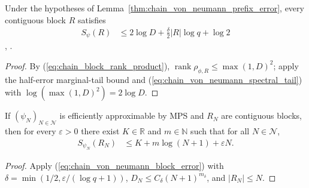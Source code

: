 \begin{lemma}
    \label{thm:chain_von_neumann_block_error}
    \leanok
    Under the hypotheses of Lemma~\ref{thm:chain_von_neumann_prefix_error},
    every contiguous block $R$ satisfies
    \begin{align}
        \label{eq:chain_von_neumann_block_error}
        S_\psi(R) & \le2\log D+\frac{\delta}{2}|R|\log q+\log2
    \end{align}
    \cite[lines 269--305]{Schuch2008EntropyScaling},
    \cite{gap:swvc08_von_neumann_error_range,gap:swvc08_interior_block_bond_rank}.
\end{lemma}
\begin{proof}\leanok
    By (\ref{eq:chain_block_rank_product}),
    $\operatorname{rank}\rho_{\phi,R}\le\max(1,D)^2$; apply the half-error
    marginal-tail bound and (\ref{eq:chain_von_neumann_spectral_tail}) with
    $\log(\max(1,D)^2)=2\log D$.
\end{proof}

\begin{lemma}
    \label{thm:efficient_mps_von_neumann_bound}
    \leanok
    If $(\psi_N)_{N\in\mathcal N}$ is efficiently approximable by MPS and $R_N$
    are contiguous blocks, then for every $\varepsilon>0$ there exist
    $K\in\mathbb R$ and $m\in\mathbb N$ such that for all $N\in\mathcal N$,
    \begin{align}
        \label{eq:efficient_mps_von_neumann_bound}
        S_{\psi_N}(R_N) & \le K+m\log(N+1)+\varepsilon N.
    \end{align}
\end{lemma}
\begin{proof}\leanok
    Apply (\ref{eq:chain_von_neumann_block_error}) with
    $\delta=\min(1/2,\varepsilon/(\log q+1))$, $D_N\le C_\delta(N+1)^{m_\delta}$,
    and $|R_N|\le N$.
\end{proof}

